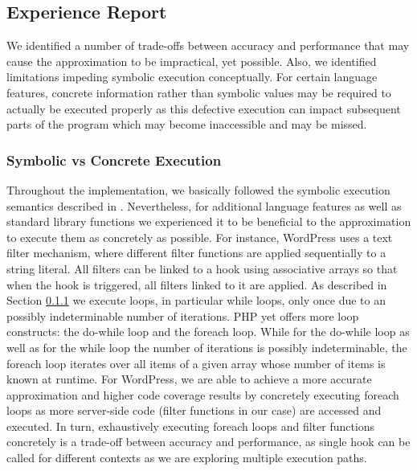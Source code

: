 \documentclass[sigconf]{acmart}
\renewcommand{\sf}[1]{\textsf{#1}}
\begin{document}
\subsection{Experience Report}
We identified a number of trade-offs between accuracy and performance that may
cause the approximation to be impractical, yet possible. Also, we identified
limitations impeding symbolic execution conceptually. For certain language
features, concrete information rather than symbolic values may be required to
actually be executed properly as this defective execution can impact subsequent
parts of the program which may become inaccessible and may be missed.

\subsubsection{Symbolic vs Concrete Execution}
Throughout the implementation, we basically followed the symbolic execution
semantics described in \cite{Nguyen:2014:BCG:2635868.2635928}. Nevertheless, for additional language features as
well as standard library functions we experienced it to be beneficial to the
approximation to execute them as concretely as possible.
For instance, \sf{WordPress} uses a text filter mechanism, where different
filter functions are applied sequentially to a string literal. All filters can
be linked to a hook using  associative arrays so that when the hook is
triggered, all filters linked to it are applied. As described in Section \ref{}
we execute loops, in particular while loops, only once due to an possibly
indeterminable number of iterations. PHP yet offers more loop constructs: the
do-while loop and the foreach loop. While for the do-while loop as well as for
the while loop the number of iterations is possibly indeterminable, the foreach
loop iterates over all items of a given array whose number of items is known at
runtime. For \sf{WordPress}, we are able to achieve a more accurate
approximation and higher code coverage results by concretely executing foreach
loops as more server-side code (filter functions in our case) are accessed and
executed. In turn, exhaustively executing foreach loops and filter functions
concretely is a trade-off between accuracy and performance, as single hook can
be called for different contexts as we are exploring multiple execution paths.
\end{document}
